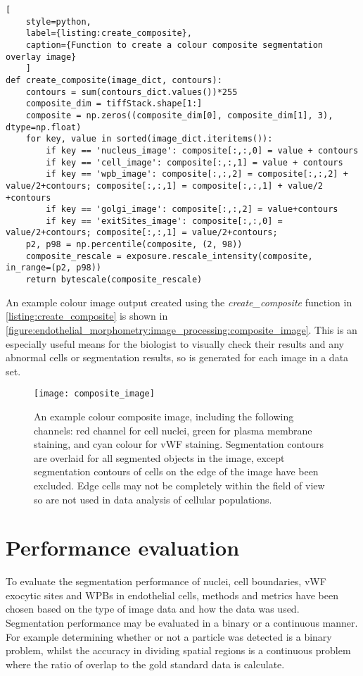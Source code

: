 \begin{lstlisting}[
	style=python,
	label={listing:create_composite},
	caption={Function to create a colour composite segmentation overlay image}
	]
def create_composite(image_dict, contours):
    contours = sum(contours_dict.values())*255
    composite_dim = tiffStack.shape[1:]
    composite = np.zeros((composite_dim[0], composite_dim[1], 3), dtype=np.float)
    for key, value in sorted(image_dict.iteritems()):
        if key == 'nucleus_image': composite[:,:,0] = value + contours
        if key == 'cell_image': composite[:,:,1] = value + contours
        if key == 'wpb_image': composite[:,:,2] = composite[:,:,2] + value/2+contours; composite[:,:,1] = composite[:,:,1] + value/2 +contours
        if key == 'golgi_image': composite[:,:,2] = value+contours
        if key == 'exitSites_image': composite[:,:,0] = value/2+contours; composite[:,:,1] = value/2+contours;
    p2, p98 = np.percentile(composite, (2, 98))
    composite_rescale = exposure.rescale_intensity(composite, in_range=(p2, p98))
    return bytescale(composite_rescale)
\end{lstlisting}

An example colour image output created using the \emph{create\_composite} function in \autoref{listing:create_composite} is shown in \autoref{figure:endothelial_morphometry:image_processing:composite_image}. This is an especially useful means for the biologist to visually check their results and any abnormal cells or segmentation results, so is generated for each image in a data set.

\begin{figure}[htbp!] %
	\centering
	\texttt{[image: composite\_image]}
	\caption[Colour composite image with segmentation contours]{An example colour composite image, including the following channels: red channel for cell nuclei, green for plasma membrane staining, and cyan colour for vWF staining. Segmentation contours are overlaid for all segmented objects in the image, except segmentation contours of cells on the edge of the image have been excluded. Edge cells may not be completely within the field of view so are not used in data analysis of cellular populations.}
	\label{figure:endothelial_morphometry:image_processing:composite_image}
\end{figure}

\section{Performance evaluation}
\label{endothelial_morphometry:performance_evaluation}
To evaluate the segmentation performance of nuclei, cell boundaries, vWF exocytic sites and WPBs in endothelial cells, methods and metrics have been chosen based on the type of image data and how the data was used. Segmentation performance may be evaluated in a binary or a continuous manner. For example determining whether or not a particle was detected is a binary problem, whilst the accuracy in dividing spatial regions is a continuous problem where the ratio of overlap to the gold standard data is calculate.

